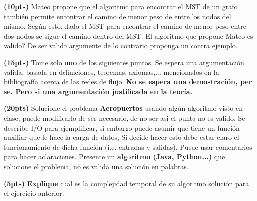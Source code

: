 \documentclass[12pt, a4paper]{exam}
\begin{document}
\begin{questions}
	\pointsdroppedatright

	\question \textbf{(10pts)} Mateo propone que el algoritmo para encontrar el MST de
	un grafo también permite encontrar el camino de menor peso de entre los nodos del
	mismo. Según esto, dado el MST para encontrar el camino de menor peso entre dos nodos
	se sigue el camino dentro del MST. El algoritmo que propone Mateo es valido? De ser
	valido argumente de lo contrario proponga un contra ejemplo.

	\question  \textbf{(15pts)} Tome solo \textbf{uno} de los siguientes puntos. Se espera
	una argumentación valida, basada en definiciones, teoremas, axiomas,... mencionados en
	la bibliografía acerca de las redes de flujo. \textbf{No se espera una demostración,
	per se. Pero si una argumentación justificada en la teoría.}



	\question \textbf{(20pts)} Solucione el problema \textbf{Aeropuertos}  
	usando algún algoritmo visto en clase, puede modificarlo de ser necesario, de no ser
	asi el punto no es valido. Se describe I/O para ejemplificar, si embargo puede asumir
	que tiene un función auxiliar que le hace la carga de datos, Si decide hacer esto debe
	estar claro el funcionamiento de dicha función (i.e. entradas y salidas).  Puede
	usar comentarios para hacer aclaraciones. Presente un \textbf{algoritmo (Java,
	Python...)} que solucione el problema, no es valida una solución en palabras. 
	
	\question \textbf{(5pts)} \textbf{Explique} cual es la complejidad temporal de su
	algoritmo solución para el ejercicio anterior.

\end{questions}

\end{document}

